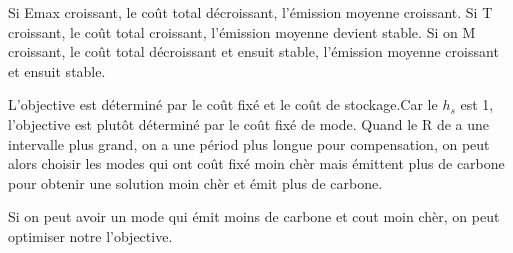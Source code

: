 \documentclass[12pt,a4paper]{article}
\begin{document}
Si Emax croissant, le coût total décroissant, l'émission moyenne croissant. Si T croissant, le coût total croissant, l'émission moyenne devient stable. Si on M croissant, le coût total décroissant et ensuit stable, l'émission moyenne croissant et ensuit stable.

L'objective est déterminé par le coût fixé et le coût de stockage.Car le $h_s$ est 1, l'objective est plutôt déterminé par le coût fixé de mode. Quand le R de a une intervalle plus grand, on a une périod plus longue pour compensation, on peut alors choisir les modes qui ont coût fixé moin chèr mais émittent plus de carbone pour obtenir une solution moin chèr et émit plus de carbone. 

Si on peut avoir un mode qui émit moins de carbone et  cout moin chèr, on peut optimiser notre l'objective.
\end{document}
